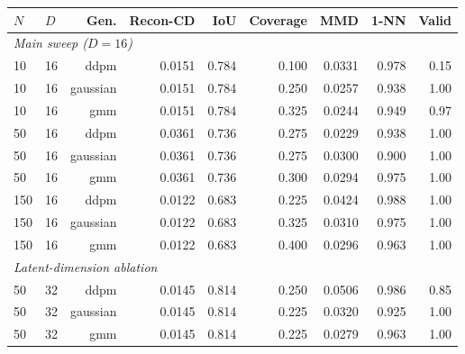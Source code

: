 \begin{tabular}{llrrrrrrr}
\toprule
$N$ & $D$ & Gen. & Recon-CD & IoU & Coverage & MMD & 1-NN & Valid \\
\midrule
\multicolumn{9}{l}{\textit{Main sweep ($D=16$)}} \\
10 & 16 & ddpm & 0.0151 & 0.784 & 0.100 & 0.0331 & 0.978 & 0.15 \\
10 & 16 & gaussian & 0.0151 & 0.784 & 0.250 & 0.0257 & 0.938 & 1.00 \\
10 & 16 & gmm & 0.0151 & 0.784 & 0.325 & 0.0244 & 0.949 & 0.97 \\
50 & 16 & ddpm & 0.0361 & 0.736 & 0.275 & 0.0229 & 0.938 & 1.00 \\
50 & 16 & gaussian & 0.0361 & 0.736 & 0.275 & 0.0300 & 0.900 & 1.00 \\
50 & 16 & gmm & 0.0361 & 0.736 & 0.300 & 0.0294 & 0.975 & 1.00 \\
150 & 16 & ddpm & 0.0122 & 0.683 & 0.225 & 0.0424 & 0.988 & 1.00 \\
150 & 16 & gaussian & 0.0122 & 0.683 & 0.325 & 0.0310 & 0.975 & 1.00 \\
150 & 16 & gmm & 0.0122 & 0.683 & 0.400 & 0.0296 & 0.963 & 1.00 \\
\midrule
\multicolumn{9}{l}{\textit{Latent-dimension ablation}} \\
50 & 32 & ddpm & 0.0145 & 0.814 & 0.250 & 0.0506 & 0.986 & 0.85 \\
50 & 32 & gaussian & 0.0145 & 0.814 & 0.225 & 0.0320 & 0.925 & 1.00 \\
50 & 32 & gmm & 0.0145 & 0.814 & 0.225 & 0.0279 & 0.963 & 1.00 \\
\bottomrule
\end{tabular}